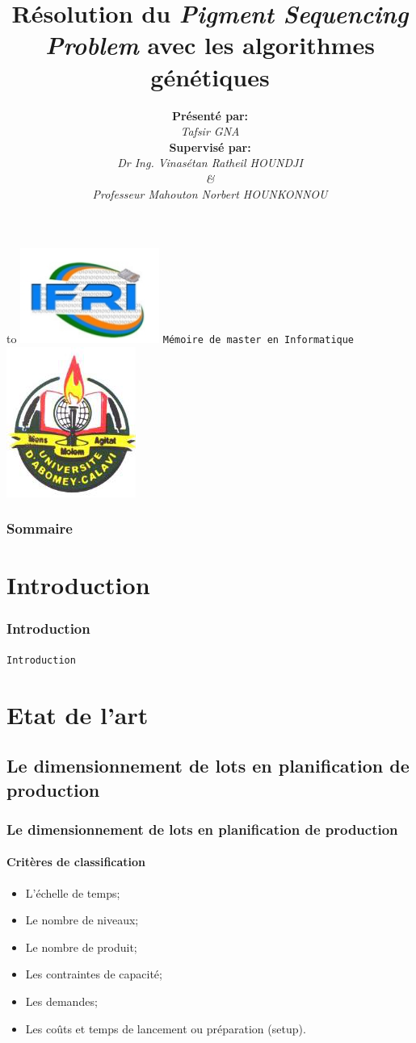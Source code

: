 \documentclass[11pt]{beamer}
\author{\textbf{Présenté par:} \\ \textit{Tafsir GNA} \\ \textbf{Supervisé par:} \\ \textit{Dr Ing. Vinasétan Ratheil HOUNDJI \\ \& \\ Professeur Mahouton Norbert HOUNKONNOU}}
\title{Résolution du \emph{Pigment Sequencing Problem} avec les algorithmes génétiques}
\institute{Institut de Formation et de Recherche en Informatique (IFRI)}
\begin{document}
 
 \begin{frame}
	\hbox to \textwidth
 	{
 		\includegraphics[scale=0.2]{img/ifri_logo.png}
 		\hfill
 		\texttt{Mémoire de master en Informatique}
 		\hfill
 		\includegraphics[scale=0.2]{img/uac_logo.png}
 	}
	\titlepage
\end{frame} 


 
 \begin{frame}
 \frametitle{Sommaire}
 \tableofcontents
 \end{frame}
 
 \section*{Introduction}
 \begin{frame}
 \frametitle{Introduction}
 	\begin{center}
 		\LARGE{\texttt{Introduction}}
 	\end{center}
 \end{frame}
 
 \section{Etat de l'art}
 \subsection{Le dimensionnement de lots en planification de production}
 \begin{frame}
 \frametitle{Le dimensionnement de lots en planification de production}
 \framesubtitle{Critères de classification}
	\begin{itemize}
		\item L’échelle de temps;
		\item Le nombre de niveaux;
		\item Le nombre de produit;
		\item Les contraintes de capacité;
		\item Les demandes;
		\item Les coûts et temps de lancement ou préparation (setup).
	\end{itemize}
 \end{frame}
 
\end{document}

